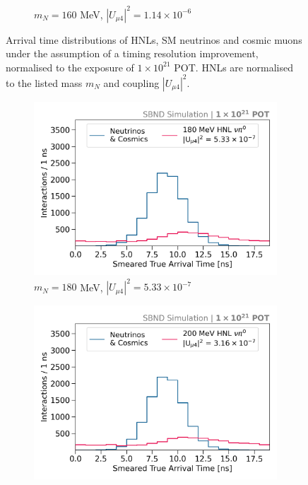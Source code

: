\begin{figure}[htbp!]
\begin{subfigure}[b]{0.495\textwidth}
            \caption{$m_N = 160$ MeV, $|U_{\mu4}|^2 = 1.14 \times 10^{-6}$ }
        \end{subfigure}
        \caption[Smeared True Arrival Time Distributions in the Mass Range 140 - 160 MeV]{
	Arrival time distributions of HNLs, SM neutrinos and cosmic muons under the assumption of a timing resolution improvement, normalised to the exposure of $1 \times 10^{21}$ POT.
	HNLs are normalised to the listed mass $m_N$ and coupling $|U_{\mu4}|^2$.
	}
\end{figure}

\begin{figure}[htbp!]
        \begin{subfigure}[b]{0.495\textwidth}
            \includegraphics[width=\textwidth]{m180}
            \caption{$m_N = 180$ MeV, $|U_{\mu4}|^2 = 5.33 \times 10^{-7}$ }
        \end{subfigure}
        \begin{subfigure}[b]{0.495\textwidth}
            \includegraphics[width=\textwidth]{m200}

\end{subfigure}
\end{figure}

